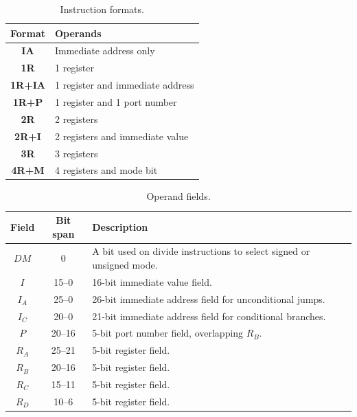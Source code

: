 \documentclass[12pt,english,twoside]{report}
\begin{document}
\begin{table}[p]
\begin{center}
\begin{tabular}{c|l}
  \textbf{Format} & \textbf{Operands}\\
  \hline
  \textbf{IA} & Immediate address only\\
  \hline
  \textbf{1R} & 1 register\\
  \hline
  \textbf{1R+IA} & 1 register and immediate address\\
  \hline
  \textbf{1R+P} & 1 register and 1 port number\\
  \hline
  \textbf{2R} & 2 registers\\
  \hline
  \textbf{2R+I} & 2 registers and immediate value\\
  \hline
  \textbf{3R} & 3 registers\\
  \hline
  \textbf{4R+M} & 4 registers and mode bit
\end{tabular}
\caption{\label{tab:InstructionFormats} Instruction formats.}
\end{center}
\end{table}

\begin{table}[p]
  \begin{center}
\begin{tabular}{c|c|l}
  \textbf{Field} & \textbf{Bit span} & \textbf{Description}\\
  \hline
  $DM$ & 0 & A bit used on divide instructions to select signed or unsigned mode.\\
  \hline
  $I$ & 15--0 & 16-bit immediate value field.\\
  \hline
  $I_A$ & 25--0 & 26-bit immediate address field for unconditional jumps.\\
  \hline
  $I_C$ & 20--0 & 21-bit immediate address field for conditional branches.\\
  \hline
  $P$ & 20--16 & 5-bit port number field, overlapping $R_B$.\\
  \hline
  $R_A$ & 25--21 & 5-bit register field.\\
  \hline
  $R_B$ & 20--16 & 5-bit register field.\\
  \hline
  $R_C$ & 15--11 & 5-bit register field.\\
  \hline
  $R_D$ & 10--6 & 5-bit register field.
\end{tabular}
\caption{\label{tab:InstructionFields} Operand fields.}
\end{center}
\end{table}
\end{document}
